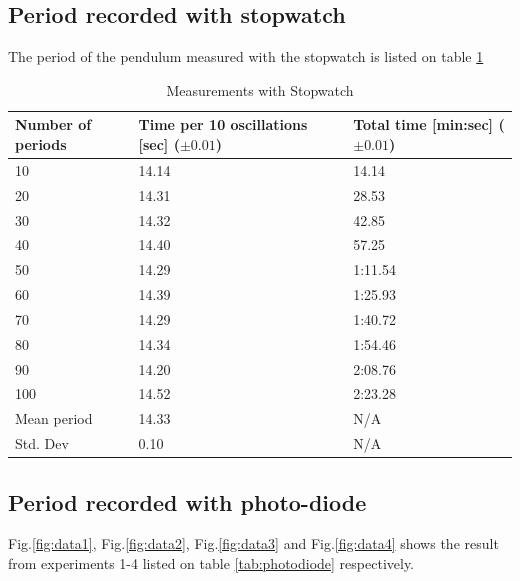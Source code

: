 \documentclass[%
 reprint,
 amsmath,amssymb,
 aps,
]{revtex4-1}
\begin{document}
	\subsection{Period recorded with stopwatch}

        The period of the pendulum measured with the stopwatch is listed on table \ref{tab:stopwatch}

    	\begin{table}[h] %
            \center
            \caption{Measurements with Stopwatch}
            \label{tab:stopwatch}
    	    \begin{tabular}{| p{1.5cm} | p{2cm} | p{2cm} |}
    		    \hline
    		    Number of periods & Time per 10 oscillations [sec] ($\pm 0.01$) & Total time [min:sec] ($\pm 0.01$)\\ \hline
    		    10 & 14.14 & 14.14 \\ \hline
    		    20 & 14.31 & 28.53 \\ \hline
    		    30 & 14.32 & 42.85 \\ \hline
    		    40 & 14.40 & 57.25 \\ \hline
    		    50 & 14.29 & 1:11.54 \\ \hline
    		    60 & 14.39 & 1:25.93 \\ \hline
    		    70 & 14.29 & 1:40.72 \\ \hline
    		    80 & 14.34 & 1:54.46 \\ \hline
    		    90 & 14.20 & 2:08.76 \\ \hline
    		    100 & 14.52 & 2:23.28 \\ \hline
                \hline
                Mean period & 14.33 & N/A \\ \hline
                Std. Dev & 0.10 & N/A \\ \hline
            \end{tabular}
        \end{table}
        
    \subsection{Period recorded with photo-diode}

        Fig.\ref{fig:data1}, Fig.\ref{fig:data2}, Fig.\ref{fig:data3} and Fig.\ref{fig:data4} shows the result from experiments 1-4 listed on table \ref{tab:photodiode} respectively.
\end{document}
